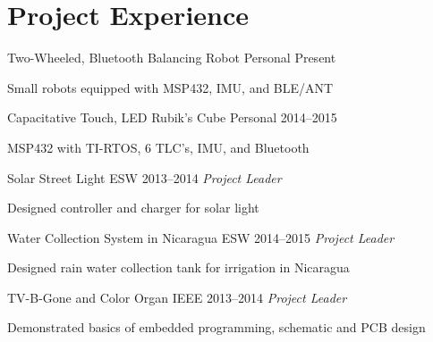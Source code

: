 \documentclass[]{friggeri-cv} %
\begin{document}
\section{Project Experience}
\begin{entrylist}
\entryFourItem
{Two-Wheeled, Bluetooth Balancing Robot}
{Personal}
{Present}
{\begin{itemizenosep}
	\item Small robots equipped with MSP432, IMU, and BLE/ANT
\end{itemizenosep}}
\entryFourItem
{Capacitative Touch, LED Rubik's Cube}
{Personal}
{2014--2015}
{\begin{itemizenosep}
	\item MSP432 with TI-RTOS, 6 TLC's, IMU, and Bluetooth
\end{itemizenosep}}
\entry
{Solar Street Light}
{ESW}
{2013--2014}
{\emph{Project Leader}}
{\begin{itemizenosep}
	\item Designed controller and charger for solar light
\end{itemizenosep}}
\entry
{Water Collection System in Nicaragua}
{ESW}
{2014--2015}
{\emph{Project Leader}}
{\begin{itemizenosep}
	\item Designed rain water collection tank for irrigation in Nicaragua
\end{itemizenosep}}
\vspace{-8pt}
\entry
{TV-B-Gone and Color Organ}
{IEEE}
{2013--2014}
{\emph{Project Leader}}
{\begin{itemizenosep}
	\item Demonstrated basics of embedded programming, schematic and PCB design
\end{itemizenosep}}
\end{entrylist}
\vspace{-8pt}
\end{document}
